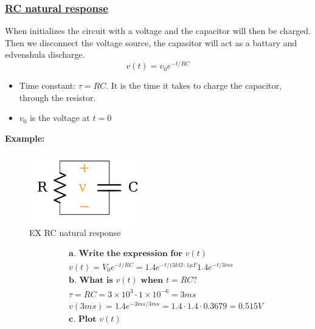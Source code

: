 \documentclass{article}
\begin{document}
\subsubsection{\href{https://www.khanacademy.org/science/electrical-engineering/ee-circuit-analysis-topic/ee-natural-and-forced-response/a/ee-rc-natural-response}{RC natural response}}
When initializes the circuit with a voltage and the capacitor will then be charged. Then we disconnect
the voltage source, the capasitor will act as a battary and edvenshula discharge. 
\begin{equation}
  v(t)=v_0e^{-t/RC}
\end{equation}
\begin{itemize}
    \item Time constant: $\tau=RC$. It is the time it takes to charge the capacitor, through the resistor.
    \item $v_0$ is the voltage at $t=0$
\end{itemize}

\textbf{Example:}
\begin{figure}[h]
    \centering
    \includegraphics[width=5cm]{image/ex_RC_natural_response.png}
    \caption{EX RC natural response}
\end{figure}

\begin{align*}
  &\quad  \textbf{a. Write the expression for } v(t) \\
  &\quad  v(t) = V_0e^{-t/RC} = 1.4e^{-t/(3k\Omega\cdot{1\mu{F}}} 1.4e^{-t/3ms} \\
  &\quad  \textbf{b. What is $v(t)$ when $t=RC$?} \\
  &\quad  \tau=RC=3\times10^3\cdot{1\times10^{-6}} = 3ms \\
  &\quad  v(3ms) = 1.4e^{-3ms/3ms} = 1.4\cdot{1.4\cdot{0.3679}} = 0.515V \\
  &\quad  \textbf{c. Plot } v(t) \\
\end{align*}
\end{document}
